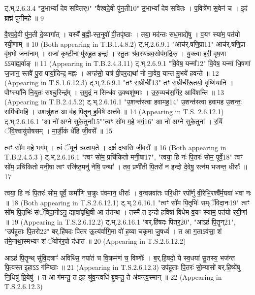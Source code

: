 \documentclass[17pt]{extarticle}
\begin{document}
ट्.भ्.2.6.3.4 "उ॒भाभ्यां᳚ देव सवितर्{9}" "वैश्वदे॒वी पु॑न॒ती{10}" 
उ॒भाभ्यां᳚ देव सवितः । प॒वित्रे॑ण स॒वेन॑ च । 
इ॒दं ब्रह्म॑ पुनीमहे ॥ {9}

वै॒श्व॒दे॒वी पु॑न॒ती दे॒व्यागा᳚त् । 
यस्यै॑ ब॒ह्वी-स्त॒नुवो॑ वी॒तपृ॑ष्ठाः । 
तया॒ मद॑न्तः सध॒माद्ये॑षु । 
व॒यꣳ स्या॑म॒ पत॑यो रयी॒णाम् ॥ {10} 
(Both appearing in T.B.1.4.8.2)
ट्.भ्.2.6.9.1 "आच॑र्.षणि॒प्रा{11}" 
आच॑र्.षणि॒प्रा वृ॑ष॒भो जना॑नाम् । 
राजा॑ कृष्टी॒नां पु॑रुहू॒त इन्द्रः॑ । 
स्तु॒तः श्र॑व॒स्यन्नव॒सोप॑म॒द्रिक् । 
यु॒क्त्वा हरी॒ वृष॒णा ऽऽया᳚ह्य॒र्वाङ् ॥ {11}
(Appearing in T.B.2.4.3.11)
ट्.भ्.2.6.9.1 "वि॒वेष॒ यन्मा᳚{12}" 
वि॒वेष॒ यन्मा॑ धि॒षणा॑ ज॒जान॒ स्तवै॑ 
पु॒रा पार्या॒दिन्द्र॒ मह्नः॑ । 
अꣳह॑सो॒ यत्र॑ पी॒पर॒द्यथा॑ नो ना॒वेव॒ 
यान्त॑ मु॒भये॑ हवन्ते ॥ {12}
(Appearing in T.S.1.6.12.3)
ट्.भ्.2.6.9.1 "तꣳ स॒ध्रीचीः᳚{13}" 
तꣳ स॒ध्रीची॑रू॒तयो॒ वृष्णि॑यानि । 
पौꣳस्या॑नि नि॒युतः॑ सश्चु॒रिन्द्र᳚म् । 
स॒मु॒द्रं न सिन्ध॑व उ॒क्थशु॑ष्माः । उ॒रु॒व्यच॑स॒गिंर॒ आवि॑शन्ति ॥ {13}
(Appearing in T.B.2.4.5.2)
ट्.भ्.2.6.16.1 "उ॒शन्त॑स्त्वा हवामह॒{14}" 
उ॒शन्त॑स्त्वा हवामह उ॒शन्तः॒ समि॑धीमहि । 
उ॒शन्नु॑श॒त आ व॑ह पि॒तॄन् ह॒विषे॒ अत्त॑वे ॥ {14}
(Appearing in T.S. 2.6.12.1)
ट्.भ्.2.6.16.1 "आ नो॑ अग्ने सुके॒तुना᳚{15}""त्वꣳ सो॑म म॒हे भगं॒{16}"
आ नो॑ अग्ने सुके॒तुना᳚ । र॒यिं ॅवि॒श्वायु॑पोषसम् । 
मा॒र्डी॒कं धे॑हि जी॒वसे᳚ ॥ {15}

त्वꣳ सो॑म म॒हे भग᳚म् । त्वं ॅयून॑ ऋताय॒ते । 
दक्षं॑ दधासि जी॒वसे᳚ ॥ {16}
(Both appearing in T.B.2.4.5.3 )
ट्.भ्.2.6.16.1 "त्वꣳ सो॑म॒ प्रचि॑कितो मनी॒षा{17}", 
"त्वया॒ हि नः॑ पि॒तरः॑ सोम॒ पूर्वे॒{18}" 
त्वꣳ सो॑म॒ प्रचि॑कितो मनी॒षा त्वꣳ रजि॑ष्ठ॒मनु॑ नेषि॒ पन्थां᳚ । 
तव॒ प्रणी॑ती पि॒तरो॑ न इन्दो दे॒वेषु॒ रत्न॑म 
भजन्त॒ धीराः᳚ ॥ {17}

त्वया॒ हि नः॑ पि॒तरः॑ सोम॒ पूर्वे॒ कर्मा॑णि च॒क्रुः प॑वमान॒ धीराः᳚ । व॒न्वन्नवा॑तः परि॒धीꣳ रपो᳚र्णु वी॒रेभि॒रश्वै᳚र्म॒घवा॑ भवा नः ॥ {18}
(Both appearing in T.S.2.6.12.1)
ट्.भ्.2.6.16.1 "त्वꣳ सो॑म पि॒तृभिः॑ सम्ॅविदा॒नः{19}" 
त्वꣳ सो॑म पि॒तृभिः॑ संॅविदा॒नोऽनु॒ द्यावा॑पृथि॒वी आ त॑तन्थ । तस्मै॑ त इन्दो ह॒विषा॑ विधेम व॒यꣳ स्या॑म॒ पत॑यो रयी॒णां ॥ {19}
(Appearing in T.S.2.6.12.2)
ट्.भ्.2.6.16.1 "बर्.हि॑षदः पितर॒{20}", "आऽहं पि॒तॄन्{21}", "उप॑हूताः पि॒तरो{22}" 
बर्.हि॑षदः पितर ऊ॒त्य॑र्वागि॒मा वो॑ ह॒व्या च॑कृमा जु॒षध्वं᳚ । 
त आ ग॒ताऽव॑सा॒ शं त॑मे॒नाथा॒स्मभ्यꣳ॒॒ शं ॅयोर॑र॒पो द॑धात ॥ {20}
(Appearing in T.S.2.6.12.2)

आऽहं पि॒तॄन्थ् सु॑वि॒दत्राꣳ॑ अविथ्सि॒ नपा॑तं च वि॒क्रम॑णं च॒ विष्णोः᳚ । 
ब॒र्.हि॒षदो॒ ये स्व॒धया॑ सु॒तस्य॒ भज॑न्त पि॒त्वस्त इ॒हाऽऽ ग॑मिष्ठाः ॥ {21}
(Appearing in T.S.2.6.12.3)
उप॑हूताः पि॒तरः॑ सो॒म्यासो॑ बर्.हि॒ष्ये॑षु नि॒धिषु॑ प्रि॒येषु॑ । त आ ग॑मन्तु॒ त इ॒ह श्रु॑व॒न्त्वधि॑ ब्रुवन्तु॒ ते अ॑वन्त्व॒स्मान् ॥ {22}
(Appearing in T.S.2.6.12.3)
\end{document}
